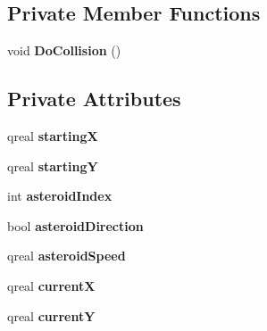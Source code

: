 \subsection*{Private Member Functions}
\begin{DoxyCompactItemize}
\item 
\hypertarget{classasteroid_a63c96ab57771fbcae25bc28b3964de40}{void {\bfseries Do\-Collision} ()}\label{classasteroid_a63c96ab57771fbcae25bc28b3964de40}

\end{DoxyCompactItemize}
\subsection*{Private Attributes}
\begin{DoxyCompactItemize}
\item 
\hypertarget{classasteroid_a3da44e6dbfc556b95e27185cb0f78297}{qreal {\bfseries starting\-X}}\label{classasteroid_a3da44e6dbfc556b95e27185cb0f78297}

\item 
\hypertarget{classasteroid_ad4dab0070eb9556f642fe50f9ada9232}{qreal {\bfseries starting\-Y}}\label{classasteroid_ad4dab0070eb9556f642fe50f9ada9232}

\item 
\hypertarget{classasteroid_a2f7ba0dfccf4fb604feba607feb0daea}{int {\bfseries asteroid\-Index}}\label{classasteroid_a2f7ba0dfccf4fb604feba607feb0daea}

\item 
\hypertarget{classasteroid_a653237a8b60a77e07599ee61533dda0c}{bool {\bfseries asteroid\-Direction}}\label{classasteroid_a653237a8b60a77e07599ee61533dda0c}

\item 
\hypertarget{classasteroid_a642fdd7b78243f43d04f6224ad2bf54c}{qreal {\bfseries asteroid\-Speed}}\label{classasteroid_a642fdd7b78243f43d04f6224ad2bf54c}

\item 
\hypertarget{classasteroid_ac5df03f095024028fb2a61be9695e522}{qreal {\bfseries current\-X}}\label{classasteroid_ac5df03f095024028fb2a61be9695e522}

\item 
\hypertarget{classasteroid_aa0d4082ffca871e9629e45cab1d7c5d2}{qreal {\bfseries current\-Y}}\label{classasteroid_aa0d4082ffca871e9629e45cab1d7c5d2}

\end{DoxyCompactItemize}



